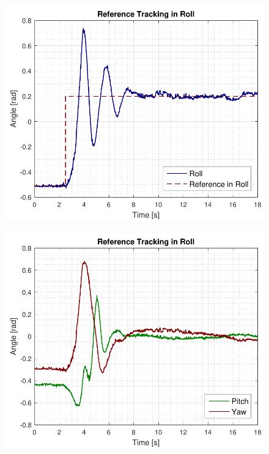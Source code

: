 \begin{minipage}{\linewidth}
    \begin{minipage}{0.46\linewidth}
        \begin{figure}[H]
            \includegraphics[scale=.6]{figures/rollRefAccept.pdf}
            \centering			
            \label{fig:rollRefAccept}
        \end{figure}
    \end{minipage}
    \hspace{0.03\linewidth}
    \begin{minipage}{0.46\linewidth}
        \begin{figure}[H]
            \includegraphics[scale=.6]{figures/rollRefAcceptPitchYaw.pdf}
            \centering
            \label{fig:rollRefAcceptPitchYaw}
        \end{figure}
    \end{minipage}
\end{minipage}




